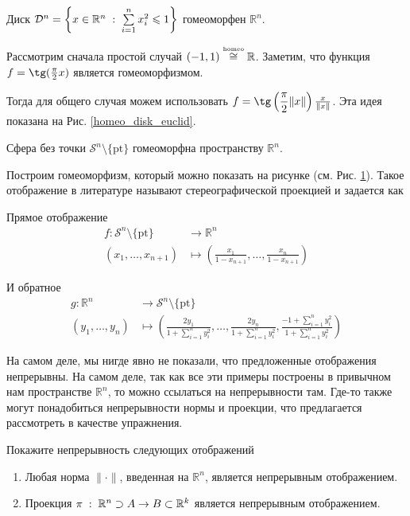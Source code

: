 \begin{Ex}
    Диск $\mathcal{D}^{n} = \left\{x\in \mathbb{R}^{n} \; : \; \sum\limits_{i=1}^{n} x_i^2 \leqslant  1\right\}$ гомеоморфен $\mathbb{R}^n$.

    Рассмотрим сначала простой случай $(-1,1) \overset{\text{\tiny homeo}}{\cong} \mathbb{R}$. Заметим, что функция $f = \tg(\frac{\pi}{2}x)$ является гомеоморфизмом. 

    Тогда для общего случая можем использовать $f = \tg\left(\dfrac{\pi}{2} \|x\| \right) \frac{x}{\|x\|}$. Эта идея показана на Рис. \ref{homeo_disk_euclid}.
\end{Ex}
\begin{Ex}
    Сфера без точки $\mathcal{S}^{n} \setminus \{\mathrm{pt}\}$ гомеоморфна пространству $\mathbb{R}^{n}$.

    Построим гомеоморфизм, который можно показать на рисунке (см. Рис. \ref{homeo_sphere_euclid}). Такое отображение в литературе называют стереографической проекцией и задается как 
\begin{figure}[H]
    \centering
    \caption{}
    \label{homeo_sphere_euclid}
\end{figure}

    Прямое отображение
    \[
    \begin{split}
        f: \mathcal{S}^n\setminus \{\mathrm{pt}\} &\to \mathbb{R}^n\\
        (x_1, \dots, x_{n+1}) &\mapsto \left(\frac{x_1}{1-x_{n+1}}, \dots, \frac{x_n}{1-x_{n+1}} \right)
    \end{split}
    \] 

    И обратное
    \[
    \begin{split}
        g: \mathbb{R}^n &\to \mathcal{S}^n\setminus \{\mathrm{pt}\}\\
        (y_1, \dots, y_n) &\mapsto \left( \frac{2y_1}{1+\sum\limits_{i=1}^{n} y_i^2}, \dots, \frac{2y_n}{1+\sum\limits_{i=1}^{n} y_i^2}, \frac{-1+\sum\limits_{i=1}^{n} y_i^2}{1+\sum\limits_{i=1}^{n} y_i^2} \right)
    \end{split}
    \] 
\end{Ex}
\begin{Note}
    На самом деле, мы нигде явно не показали, что предложенные отображения непрерывны. На самом деле, так как все эти примеры построены в привычном нам пространстве $\mathbb{R}^n$, то можно ссылаться на непрерывности там. Где-то также могут понадобиться непрерывности нормы и проекции, что предлагается рассмотреть в качестве упражнения.
\end{Note}
    \begin{Task}
        Покажите непрерывность следующих отображений
        \begin{enumerate}
            \item Любая норма $\| \cdot \|$, введенная на $\mathbb{R}^n$, является непрерывным отображением.
            \item Проекция $\pi\; : \; \mathbb{R}^n \supset A \to B \subset \mathbb{R}^k$ является непрерывным отображением.
        \end{enumerate}
    \end{Task}
